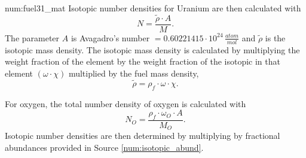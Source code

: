 \begin{numitem}{num:fuel31_mat}
Isotopic number densities for Uranium are then calculated with
\[
    N = \frac{\widetilde{\rho} \cdot A}{M}.
\]
The parameter $A$ is Avagadro's number $=0.60221415\cdot 10^{24}\,\frac{atom}{mol}$ and $\widetilde{\rho}$ is the isotopic mass density. The isotopic mass density is calculated by multiplying the weight fraction of the element by the weight fraction of the isotopic in that element $\left(\omega\cdot\chi\right)$ multiplied by the fuel mass density,
\[
  \widetilde{\rho} = \rho_f\cdot \omega \cdot \chi.
\]

For oxygen, the total number density of oxygen is calculated with
\[
    N_O = \frac{\rho_f \cdot \omega_O \cdot A}{M_O}.
\]
Isotopic number densities are then determined by multiplying by fractional abundances provided in Source \ref{num:isotopic_abund}.


\end{numitem}

